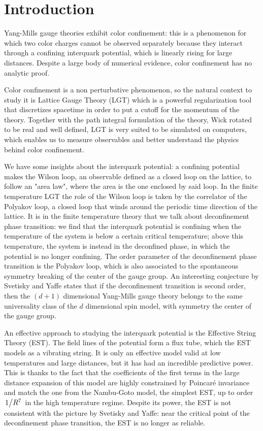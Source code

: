 \documentclass[reqno,12pt]{article}
\numberwithin{equation}{section}
\begin{document}
\newpage

\tableofcontents

\newpage

\section{Introduction}

Yang-Mills gauge theories exhibit color confinement: this is a phenomenon for which two color charges cannot be
observed separately because they interact through a confining interquark potential, which is linearly rising for
large distances. Despite a large body of numerical evidence, color confinement has no analytic proof.

Color confinement is a non perturbative phenomenon, so the natural context to study it is Lattice Gauge Theory (LGT) which is
a powerful regularization tool that discretizes spacetime in order to put a cutoff for the momentum of the theory. Together with
the path integral formulation of the theory, Wick rotated to be real and well defined, LGT is very suited to be simulated
on computers, which enables us to measure observables and better understand the physics behind color confinement. 

We have some insights about the interquark potential: a confining potential makes the Wilson loop, an observable defined
as a closed loop on the lattice, to follow an "area law", where the area is the one enclosed by said loop. In the
finite temperature LGT the role of the Wilson loop is taken by the correlator of the Polyakov loop, a closed loop that winds
around the periodic time direction of the lattice. It is in the finite temperature theory that we talk about deconfinement
phase transition: we find that the interquark potential is confining when the temperature of the system is below a certain
critical temperature; above this temperature, the system is instead in the deconfined phase, in which the potential is 
no longer confining. The order parameter of the deconfinement phase transition is the Polyakov loop, which is also 
associated to the spontaneous symmetry breaking of the center of the gauge group. An interesting conjecture by
Svetisky and Yaffe states that if the deconfinement transition is second order, then the $(d+1)$ dimensional
Yang-Mills gauge theory belongs to the same universality class of the $d$ dimensional spin model, with symmetry
the center of the gauge group. 

An effective approach to studying the interquark potential is the Effective String Theory (EST). The field lines of the 
potential form a flux tube, which the EST models as a vibrating string. It is only an effective model valid at low temperatures
and large distances, but it has had an incredible predictive power. This is thanks to the fact that the coefficients of the
first terms in the large distance expansion of this model are highly constrained by Poincaré invariance and match the one from
the Nambu-Goto model, the simplest EST, up to order $\flatfrac{1}{R^7}$ in the high temperature regime.
Despite its power, the EST is not consistent
with the picture by Svetisky and Yaffe: near the critical point of the deconfinement phase transition, the EST is no longer
as reliable. 
\end{document}
